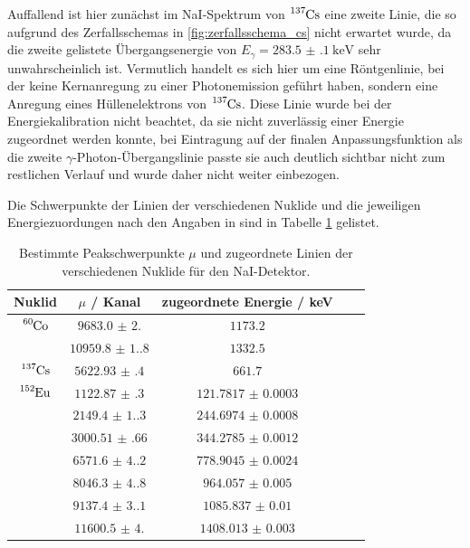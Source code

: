 Auffallend ist hier zunächst im NaI-Spektrum von $\ce{^137Cs}$ eine zweite Linie, die so aufgrund des Zerfallsschemas in \ref{fig:zerfallsschema_cs} nicht erwartet wurde, da die zweite gelistete Übergangsenergie von $E_\gamma=\SI{283.5(1)}{\kilo\eV}$ sehr unwahrscheinlich ist. Vermutlich handelt es sich hier um eine Röntgenlinie, bei der keine Kernanregung zu einer Photonemission geführt haben, sondern eine Anregung eines Hüllenelektrons von $\ce{^137Cs}$. Diese Linie wurde bei der Energiekalibration nicht beachtet, da sie nicht zuverlässig einer Energie zugeordnet werden konnte, bei Eintragung auf der finalen Anpassungsfunktion als die zweite $\gamma$-Photon-Übergangslinie passte sie auch deutlich sichtbar nicht zum restlichen Verlauf und wurde daher nicht weiter einbezogen.

Die Schwerpunkte der Linien der verschiedenen Nuklide und die jeweiligen Energiezuordungen nach den Angaben in \cite[8]{521versuchsanleitung} sind in Tabelle \ref{tab:zuordnungen_nai} gelistet.

\begin{table}[h]
    \centering
    \begin{tabular}{|c|c|c|c|c|} \hline
    Nuklid & $\mu$ / Kanal & zugeordnete Energie / keV \\
	\hline \hline
	$\ce{^60Co}$ & $\num{9683.0(2.0)}$ & $\num{1173.2}$ \\
     & $ \num{10959.8(1.8)}$ & $\num{1332.5}$ \\
    \hline
    $\ce{^137Cs}$ & $ \num{5622.93(40)}$ & $\num{661.7}$ \\
    \hline
    $\ce{^152Eu}$ & $\num{1122.87(30)}$ & $\num{121.7817(3)}$ \\
    & $\num{2149.4(1.3)}$ &$\num{244.6974(8)}$ \\
    & $\num{3000.51(66)}$ & $\num{344.2785(12)}$ \\
    & $\num{6571.6(4.2)}$ & $\num{778.9045(24)}$ \\
    & $\num{8046.3(4.8)}$ & $\num{964.057(5)}$ \\
    & $\num{9137.4(3.1)}$ & $\num{1085.837(10)}$ \\
    & $\num{11600.5(4.0)}$ & $\num{1408.013(3)}$ \\
	\hline
    \end{tabular}
    \caption{Bestimmte Peakschwerpunkte $\mu$ und zugeordnete Linien der verschiedenen Nuklide für den NaI-Detektor.}
    \label{tab:zuordnungen_nai}
\end{table}

